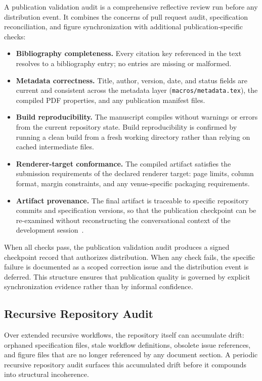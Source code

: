 A publication validation audit is a comprehensive reflective review run before any distribution event. It combines the concerns of pull request audit, specification reconciliation, and figure synchronization with additional publication-specific checks:

\begin{itemize}
  \item \textbf{Bibliography completeness.} Every citation key referenced in the text resolves to a bibliography entry; no entries are missing or malformed.
  \item \textbf{Metadata correctness.} Title, author, version, date, and status fields are current and consistent across the metadata layer (\texttt{macros/metadata.tex}), the compiled PDF properties, and any publication manifest files.
  \item \textbf{Build reproducibility.} The manuscript compiles without warnings or errors from the current repository state. Build reproducibility is confirmed by running a clean build from a fresh working directory rather than relying on cached intermediate files.
  \item \textbf{Renderer-target conformance.} The compiled artifact satisfies the submission requirements of the declared renderer target: page limits, column format, margin constraints, and any venue-specific packaging requirements.
  \item \textbf{Artifact provenance.} The final artifact is traceable to specific repository commits and specification versions, so that the publication checkpoint can be re-examined without reconstructing the conversational context of the development session~\cite{Lamport1978TimeClocks}.
\end{itemize}

When all checks pass, the publication validation audit produces a signed checkpoint record that authorizes distribution. When any check fails, the specific failure is documented as a scoped correction issue and the distribution event is deferred. This structure ensures that publication quality is governed by explicit synchronization evidence rather than by informal confidence.

\subsection{Recursive Repository Audit}

Over extended recursive workflows, the repository itself can accumulate drift: orphaned specification files, stale workflow definitions, obsolete issue references, and figure files that are no longer referenced by any document section. A periodic recursive repository audit surfaces this accumulated drift before it compounds into structural incoherence.

